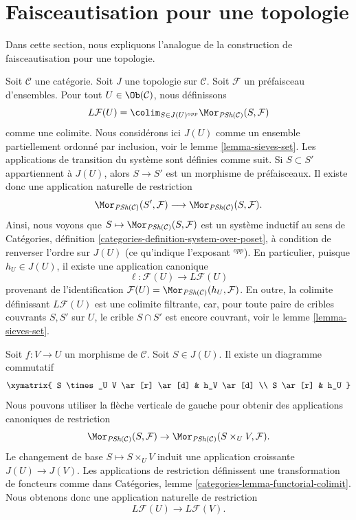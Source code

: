 
















\section{Faisceautisation pour une topologie}
\label{section-sheafification-topology}

\noindent
Dans cette section, nous expliquons l'analogue de la
construction de faisceautisation pour une topologie.

\medskip\noindent
Soit $\mathcal{C}$ une catégorie.
Soit $J$ une topologie sur $\mathcal{C}$.
Soit $\mathcal{F}$ un préfaisceau d'ensembles.
Pour tout $U \in \Ob(\mathcal{C})$, nous
définissons
$$
L\mathcal{F}(U)
=
\colim_{S \in J(U)^{opp}}
\Mor_{\textit{PSh}(\mathcal{C})}(S, \mathcal{F})
$$
comme une colimite. Nous considérons ici $J(U)$ comme un ensemble
partiellement ordonné par inclusion, voir le lemme \ref{lemma-sieves-set}. Les
applications de transition du système sont définies comme suit.
Si $S \subset S'$ appartiennent à $J(U)$, alors $S \to S'$ est
un morphisme de préfaisceaux. Il existe donc une application naturelle
de restriction
$$
\Mor_{\textit{PSh}(\mathcal{C})}(S', \mathcal{F})
\longrightarrow
\Mor_{\textit{PSh}(\mathcal{C})}(S, \mathcal{F}).
$$
Ainsi, nous voyons que
$S \mapsto \Mor_{\textit{PSh}(\mathcal{C})}(S, \mathcal{F})$
est un système inductif au sens de Catégories,
définition \ref{categories-definition-system-over-poset},
à condition de renverser l'ordre
sur $J(U)$ (ce qu'indique l'exposant ${}^{opp}$).
En particulier, puisque $h_U \in J(U)$,
il existe une application canonique
$$
\ell : \mathcal{F}(U) \longrightarrow L\mathcal{F}(U)
$$
provenant de l'identification
$\mathcal{F}(U) = \Mor_{\textit{PSh}(\mathcal{C})}(h_U, \mathcal{F})$.
En outre, la colimite définissant $L\mathcal{F}(U)$ est une colimite filtrante,
car, pour toute paire de cribles couvrants $S, S'$ sur $U$, le
crible $S \cap S'$ est encore couvrant, voir le lemme \ref{lemma-sieves-set}.

\medskip\noindent
Soit $f : V \to U$ un morphisme de $\mathcal{C}$.
Soit $S \in J(U)$. Il existe un diagramme commutatif
$$
\xymatrix{
S \times_U V \ar[r] \ar[d] & h_V \ar[d] \\
S \ar[r] & h_U
}
$$
Nous pouvons utiliser la flèche verticale de gauche pour obtenir des applications canoniques de restriction
$$
\Mor_{\textit{PSh}(\mathcal{C})}(S, \mathcal{F})
\to \Mor_{\textit{PSh}(\mathcal{C})}(S \times_U V, \mathcal{F}).
$$
Le changement de base $S \mapsto S \times_U V$ induit une application
croissante $J(U) \to J(V)$. Les applications de restriction
définissent une transformation de foncteurs comme dans
Catégories, lemme \ref{categories-lemma-functorial-colimit}.
Nous obtenons donc une application naturelle de restriction
$$
L\mathcal{F}(U) \longrightarrow L\mathcal{F}(V).
$$

